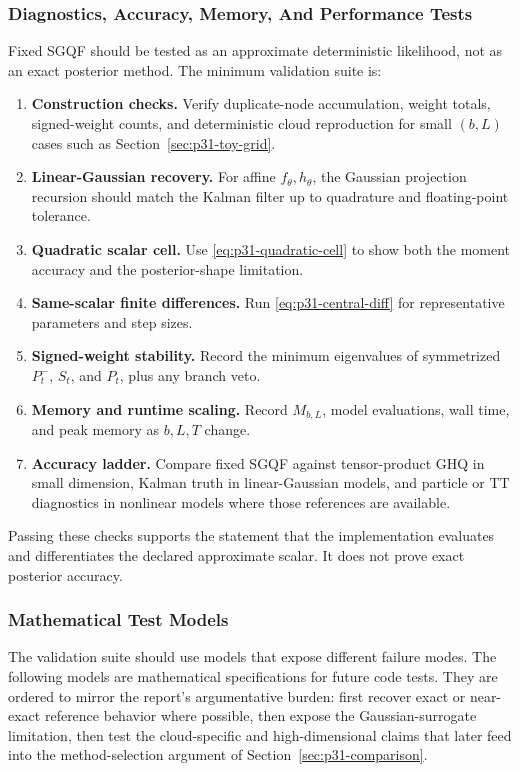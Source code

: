 \documentclass[11pt]{article}
\numberwithin{equation}{section}
\begin{document}
\subsubsection{Diagnostics, Accuracy, Memory, And Performance Tests}
\label{sec:p31-validation}

Fixed SGQF should be tested as an approximate deterministic likelihood, not as
an exact posterior method.  The minimum validation suite is:

\begin{enumerate}[leftmargin=0.24in]
\item \textbf{Construction checks.}  Verify duplicate-node accumulation,
weight totals, signed-weight counts, and deterministic cloud reproduction for
small \((b,L)\) cases such as Section~\ref{sec:p31-toy-grid}.
\item \textbf{Linear-Gaussian recovery.}  For affine \(f_\theta,h_\theta\),
the Gaussian projection recursion should match the Kalman filter up to
quadrature and floating-point tolerance.
\item \textbf{Quadratic scalar cell.}  Use \eqref{eq:p31-quadratic-cell} to
show both the moment accuracy and the posterior-shape limitation.
\item \textbf{Same-scalar finite differences.}  Run
\eqref{eq:p31-central-diff} for representative parameters and step sizes.
\item \textbf{Signed-weight stability.}  Record the minimum eigenvalues of
symmetrized \(P_t^-\), \(S_t\), and \(P_t\), plus any branch veto.
\item \textbf{Memory and runtime scaling.}  Record \(M_{b,L}\), model
evaluations, wall time, and peak memory as \(b,L,T\) change.
\item \textbf{Accuracy ladder.}  Compare fixed SGQF against tensor-product GHQ
in small dimension, Kalman truth in linear-Gaussian models, and particle or TT
diagnostics in nonlinear models where those references are available.
\end{enumerate}

Passing these checks supports the statement that the implementation evaluates
and differentiates the declared approximate scalar.  It does not prove exact
posterior accuracy.

\subsubsection{Mathematical Test Models}
\label{subsec:p32-test-models}

The validation suite should use models that expose different failure modes.
The following models are mathematical specifications for future code tests.  They
are ordered to mirror the report's argumentative burden: first recover exact or
near-exact reference behavior where possible, then expose the Gaussian-surrogate
limitation, then test the cloud-specific and high-dimensional claims that later
feed into the method-selection argument of Section~\ref{sec:p31-comparison}.
\end{document}
